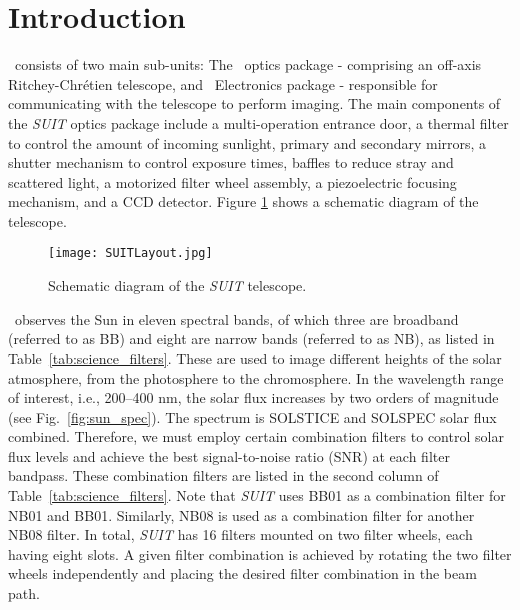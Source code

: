\justifying

\section{Introduction}\label{secc3_intro}

\suit~consists of two main sub-units: The \suit~optics package - comprising an off-axis Ritchey-Chr\'{e}tien telescope, and \suit~Electronics package - responsible for communicating with the telescope to perform imaging. The main components of the \textit{SUIT} optics package include a multi-operation entrance door, a thermal filter to control the amount of incoming sunlight, primary and secondary mirrors, a shutter mechanism to control exposure times, baffles to reduce stray and scattered light, a motorized filter wheel assembly, a piezoelectric focusing mechanism, and a CCD detector. Figure \ref{fig:suit} shows a schematic diagram of the telescope.

\begin{figure}
    \centering
    \texttt{[image: SUITLayout.jpg]}
    \caption{Schematic diagram of the \textit{SUIT} telescope.}
    \label{fig:suit}
\end{figure}

\suit~observes the Sun in eleven spectral bands, of which three are broadband (referred to as BB) and eight are narrow bands (referred to as NB), as listed in Table~\ref{tab:science_filters}. These are used to image different heights of the solar atmosphere, from the photosphere to the chromosphere. In the wavelength range of interest, i.e., 200--400 nm, the solar flux increases by two orders of magnitude (see Fig.~\ref{fig:sun_spec}). The spectrum is SOLSTICE and SOLSPEC solar flux combined. Therefore, we must employ certain combination filters to control solar flux levels and achieve the best signal-to-noise ratio (SNR) at each filter bandpass. These combination filters are listed in the second column of Table~\ref{tab:science_filters}. Note that \textit{SUIT} uses BB01 as a combination filter for NB01 and BB01. Similarly, NB08 is used as a combination filter for another NB08 filter. In total, \textit{SUIT} has 16 filters mounted on two filter wheels, each having eight slots. A given filter combination is achieved by rotating the two filter wheels independently and placing the desired filter combination in the beam path.

